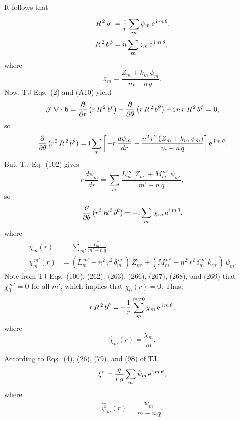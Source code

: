 \documentclass[12pt,prb,aps,notitlepage]{revtex4-1}
\begin{document}
It follows that
\begin{align}
R^{\,2}\,b^r &= \frac{{\rm i}}{r}\sum_m \psi_m\,{\rm e}^{\,{\rm i}\,m \,\theta},\\[0.5ex]
R^{\,2}\,b^\phi &= n\sum_m z_m\,{\rm e}^{\,{\rm i}\,m\,\theta},
\end{align}
where 
\begin{equation}
z_m =  \frac{Z_m+ k_m\,\psi_m}{m-n\,q}.
\end{equation}
Now,  TJ Eqs.~(2) and (A10) yield
\begin{align}
{\cal J}\,\nabla\cdot{\bf b} = \frac{\partial}{\partial r}\left(r\,R^{\,2}\,b^r\right) + \frac{\partial}{\partial \theta}\left(r\,R^{\,2}\,b^\theta\right) - {\rm i}\,n\,r\,R^{\,2}\,b^\phi = 0,
\end{align}
so
\begin{equation}
\frac{\partial}{\partial\theta}\,(r^2\,R^{\,2}\,b^\theta)={\rm i}\sum_m\left[-r\,\frac{d\psi_m}{dr}+ \frac{n^2\,r^2\,(Z_m+k_m\,\psi_m)}{m-n\,q}\right]{\rm e}^{\,{\rm i}\,m\,\theta}.
\end{equation}
But, TJ Eq.~(102) gives
\begin{equation}
r\,\frac{d\psi_m}{dr}=\sum_{m'} \frac{L_{m}^{\,m'}\,Z_{m'} + M_m^{\,m'}\,\psi_{m'}}{m'-n\,q},
\end{equation}
so
\begin{equation}
\frac{\partial}{\partial\theta}\,(r^2\,R^{\,2}\,b^\theta)=-{\rm i}\sum_{m}\,\chi_m\,{\rm e}^{\,{\rm i}\,m\,\theta},
\end{equation}
where
\begin{align}
\chi_m(r)& = \sum_{m'}\frac{\chi_m^{\,m'}}{m'-n\,q},\\[0.5ex]
\chi_m^{\,m'}(r) &= (L_m^{\,m'}- n^2\,r^2\,\delta_m^{\,m'})\,Z_{m'} + (M_m^{\,m'}-n^2\,r^2\,\delta_{m}^{\,m'}\,k_{m'})\,\psi_{m'}
\end{align}
Note from TJ Eqs.~(100), (262), (263), (266), (267), (268), and (269) that $\chi_0^{\,m'}= 0$ for all $m'$, which implies that $\chi_0(r)=0$. 
Thus,
\begin{equation}
r\,R^{\,2}\,b^\theta = -\frac{1}{r}\sum_{m}^{m\neq 0} \hat{\chi}_m\,{\rm e}^{\,{\rm i}\,m\,\theta},
\end{equation}
where 
\begin{equation}
\hat{\chi}_m(r) =\frac{ \chi_m}{m}.
\end{equation} 

According to Eqs.~(4), (26), (79), and (98) of TJ, 
\begin{equation}
\xi^r = \frac{q}{r\,g}\sum_m \hat{\psi}_m\,{\rm e}^{\,{\rm i}\,m\,\theta},
\end{equation}
where
\begin{equation}
\hat{\psi}_m(r) = \frac{\psi_m}{m-n\,q}.
\end{equation}
\end{document}

